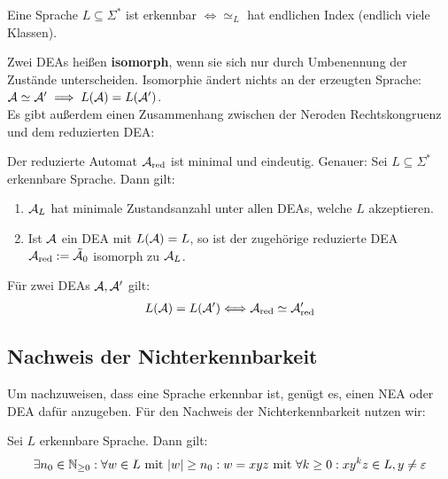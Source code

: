 \begin{satz}\label{satz2.18Nerode}
	Eine Sprache $L\subseteq\Sigma^\ast$ ist erkennbar $\Longleftrightarrow\simeq_L$ hat endlichen Index (endlich viele Klassen).
\end{satz}

Zwei DEAs heißen \textbf{isomorph}, wenn sie sich nur durch Umbenennung der Zustände unterscheiden.
Isomorphie ändert nichts an der erzeugten Sprache:\\
$\mathcal{A}\simeq\mathcal{A}'\implies L(\mathcal{A})=L(\mathcal{A}')$.\\
Es gibt außerdem einen Zusammenhang zwischen der Neroden Rechtskongruenz und dem reduzierten DEA:
 
\begin{satz}\label{satz2.22}
	Der reduzierte Automat $\mathcal{A}_{\text{red}}$ ist minimal und eindeutig.
	Genauer: Sei $L\subseteq\Sigma^\ast$ erkennbare Sprache. Dann gilt:
	\begin{enumerate}[label=\arabic*)]
		\item $\mathcal{A}_L$ hat minimale Zustandsanzahl unter allen DEAs, welche $L$ akzeptieren.
		\item Ist $\mathcal{A}$ ein DEA mit $L(\mathcal{A})=L$, so ist der zugehörige reduzierte DEA $\mathcal{A}_{\text{red}}:=\tilde{\mathcal{A}}_0$ isomorph zu $\mathcal{A}_L$.
	\end{enumerate}
\end{satz}

\begin{korollar}\label{korollar3.23}
	Für zwei DEAs $\mathcal{A},\mathcal{A}'$ gilt:
	\begin{align*}
		L(\mathcal{A})=L(\mathcal{A}')\Longleftrightarrow\mathcal{A}_{\text{red}}\simeq\mathcal{A}_{\text{red}}'
	\end{align*}
\end{korollar}

\subsection{Nachweis der Nichterkennbarkeit}
Um nachzuweisen, dass eine Sprache erkennbar ist, genügt es, einen NEA oder DEA dafür anzugeben.
Für den Nachweis der Nichterkennbarkeit nutzen wir:

\begin{lemma}\label{lemma3.1Pumpinglemma}\enter
	Sei $L$ erkennbare Sprache. Dann gilt:
	\begin{align*}
		\exists n_0\in\mathbb{N}_{\geq0}:\forall w\in L\text{ mit }|w|\geq n_0:w=xyz\text{ mit }\forall k\geq0: xy^kz\in L,y\neq\varepsilon
	\end{align*}
\end{lemma}

